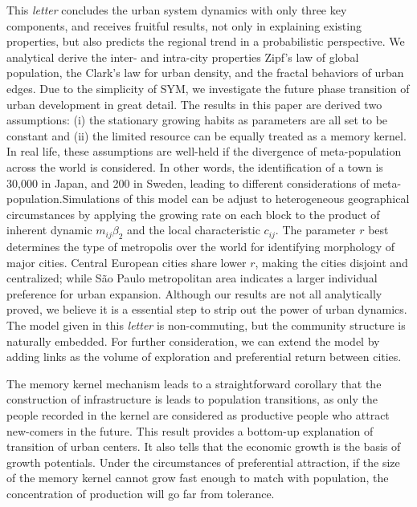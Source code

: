 \documentclass[reprint,unsortedaddress,amsmath,amssymb,floatfix,aps,prl,showkeys]{revtex4-2}
\begin{document}

This \emph{letter} concludes the urban system dynamics with only three key components, and receives fruitful results, not only in explaining existing properties, but also predicts the regional trend in a probabilistic perspective. We analytical derive the inter- and intra-city properties Zipf's law of global population, the Clark's law for urban density, and the fractal behaviors of urban edges. Due to the simplicity of SYM, we investigate the future phase transition of urban development in great detail. The results in this paper are derived two assumptions: (i) the stationary growing habits as parameters are all set to be constant and (ii) the limited resource can be equally treated as a memory kernel. In real life, these assumptions are well-held if the divergence of meta-population across the world is considered. In other words, the identification of a town is 30,000 in Japan, and 200 in Sweden, leading to different considerations of meta-population.Simulations of this model can be adjust to heterogeneous geographical circumstances by applying the growing rate on each block to the product of inherent dynamic $m_{ij}\beta_2$ and the local characteristic $c_{ij}$. The parameter $r$ best determines the type of metropolis over the world for identifying morphology of major cities. Central European cities share lower $r$, making the cities disjoint and centralized; while São Paulo metropolitan area indicates a larger individual preference for urban expansion. Although our results are not all analytically proved, we believe it is a essential step to strip out the power of urban dynamics. The model given in this \emph{letter} is non-commuting, but the community structure is naturally embedded. For further consideration, we can extend the model by adding links as the volume of exploration and preferential return between cities\cite{WANG2019121921}.

The memory kernel mechanism leads to a straightforward corollary that the construction of infrastructure is leads to population transitions, as only the people recorded in the kernel are considered as productive people who attract new-comers in the future. This result provides a bottom-up explanation of transition of urban centers. It also tells that the economic growth is the basis of growth potentials. Under the circumstances of preferential attraction, if the size of the memory kernel cannot grow fast enough to match with population, the concentration of production will go far from tolerance.


\end{document}
